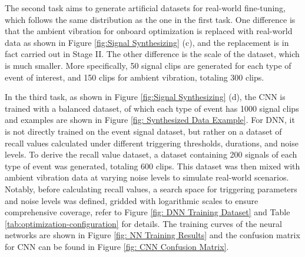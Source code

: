 \documentclass[a4paper,fleqn,numbers,sort&compress]{cas-sc}
\begin{document}
The second task aims to generate artificial datasets for real-world fine-tuning, which follows the same distribution as the one in the first task. One difference is that the ambient vibration for onboard optimization is replaced with real-world data as shown in Figure \ref{fig:Signal Synthesizing} (c), and the replacement is in fact carried out in Stage II. The other difference is the scale of the dataset, which is much smaller. More specifically, 50 signal clips are generated for each type of event of interest, and 150 clips for ambient vibration, totaling 300 clips.

In the third task, as shown in Figure \ref{fig:Signal Synthesizing} (d), the CNN is trained with a balanced dataset, of which each type of event has 1000 signal clips and examples are shown in Figure \ref{fig: Synthesized Data Example}. For DNN, it is not directly trained on the event signal dataset, but rather on a dataset of recall values calculated under different triggering thresholds, durations, and noise levels. To derive the recall value dataset, a dataset containing 200 signals of each type of event was generated, totaling 600 clips. This dataset was then mixed with ambient vibration data at varying noise levels to simulate real-world scenarios. Notably, before calculating recall values, a search space for triggering parameters and noise levels was defined, gridded with logarithmic scales to ensure comprehensive coverage, refer to Figure \ref{fig: DNN Training Dataset} and Table \ref{tab:optimization-configuration} for details. The training curves of the neural networks are shown in Figure \ref{fig: NN Training Results} and the confusion matrix for CNN can be found in Figure \ref{fig: CNN Confusion Matrix}.
\end{document}
